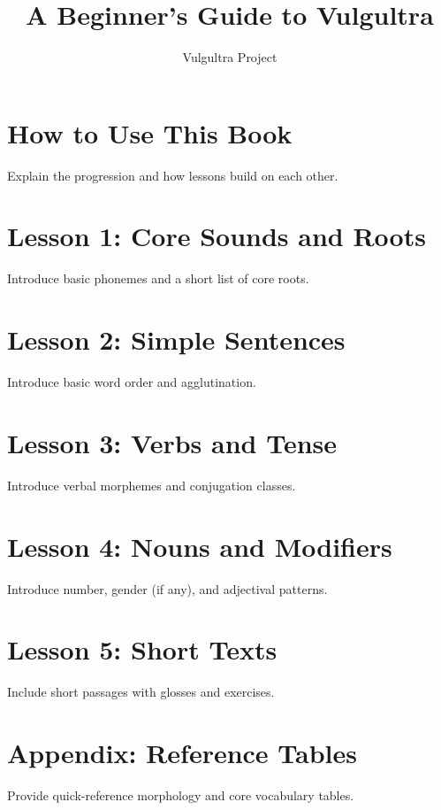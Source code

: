 \documentclass[12pt]{book}
\title{A Beginner's Guide to Vulgultra}
\author{Vulgultra Project}
\date{}
\begin{document}
\maketitle
\tableofcontents

\chapter{How to Use This Book}
Explain the progression and how lessons build on each other.

\chapter{Lesson 1: Core Sounds and Roots}
Introduce basic phonemes and a short list of core roots.

\chapter{Lesson 2: Simple Sentences}
Introduce basic word order and agglutination.

\chapter{Lesson 3: Verbs and Tense}
Introduce verbal morphemes and conjugation classes.

\chapter{Lesson 4: Nouns and Modifiers}
Introduce number, gender (if any), and adjectival patterns.

\chapter{Lesson 5: Short Texts}
Include short passages with glosses and exercises.

\chapter{Appendix: Reference Tables}
Provide quick-reference morphology and core vocabulary tables.
\end{document}
